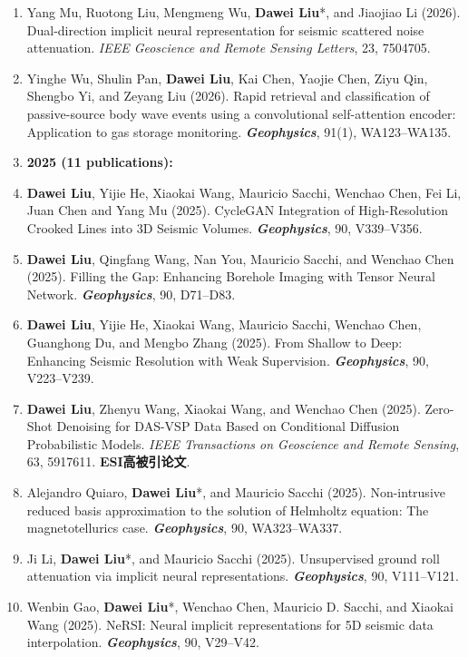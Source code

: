 \documentclass[11pt,a4paper]{article}
\begin{document}
\begin{enumerate}[leftmargin=1.5em, itemsep=0pt, topsep=2pt]
    \item Yang Mu, Ruotong Liu, Mengmeng Wu, \textbf{Dawei Liu}*, and Jiaojiao Li (2026). Dual-direction implicit neural representation for seismic scattered noise attenuation. \textit{IEEE Geoscience and Remote Sensing Letters}, 23, 7504705.
    \item Yinghe Wu, Shulin Pan, \textbf{Dawei Liu}, Kai Chen, Yaojie Chen, Ziyu Qin, Shengbo Yi, and Zeyang Liu (2026). Rapid retrieval and classification of passive-source body wave events using a convolutional self-attention encoder: Application to gas storage monitoring. \textit{\textbf{Geophysics}}, 91(1), WA123--WA135.

  \item[] \hspace{-25pt} \textbf{2025 (11 publications):}
    \item \textbf{Dawei Liu}, Yijie He, Xiaokai Wang, Mauricio Sacchi, Wenchao Chen, Fei Li, Juan Chen and Yang Mu (2025). CycleGAN Integration of High-Resolution Crooked Lines into 3D Seismic Volumes. \textit{\textbf{Geophysics}}, 90, V339--V356.
    \item \textbf{Dawei Liu}, Qingfang Wang, Nan You, Mauricio Sacchi, and Wenchao Chen (2025). Filling the Gap: Enhancing Borehole Imaging with Tensor Neural Network. \textit{\textbf{Geophysics}}, 90, D71--D83.
    \item \textbf{Dawei Liu}, Yijie He, Xiaokai Wang, Mauricio Sacchi, Wenchao Chen, Guanghong Du, and Mengbo Zhang (2025). From Shallow to Deep: Enhancing Seismic Resolution with Weak Supervision. \textit{\textbf{Geophysics}}, 90, V223--V239.
    \item \textbf{Dawei Liu}, Zhenyu Wang, Xiaokai Wang, and Wenchao Chen (2025). Zero-Shot Denoising for DAS-VSP Data Based on Conditional Diffusion Probabilistic Models. \textit{IEEE Transactions on Geoscience and Remote Sensing}, 63, 5917611. \textbf{ESI高被引论文}.
    \item Alejandro Quiaro, \textbf{Dawei Liu}*, and Mauricio Sacchi (2025). Non-intrusive reduced basis approximation to the solution of Helmholtz equation: The magnetotellurics case. \textit{\textbf{Geophysics}}, 90, WA323--WA337.
    \item Ji Li, \textbf{Dawei Liu}*, and Mauricio Sacchi (2025). Unsupervised ground roll attenuation via implicit neural representations. \textit{\textbf{Geophysics}}, 90, V111--V121.
    \item Wenbin Gao, \textbf{Dawei Liu}*, Wenchao Chen, Mauricio D. Sacchi, and Xiaokai Wang (2025). NeRSI: Neural implicit representations for 5D seismic data interpolation. \textit{\textbf{Geophysics}}, 90, V29--V42.

\end{enumerate}
\end{document}
